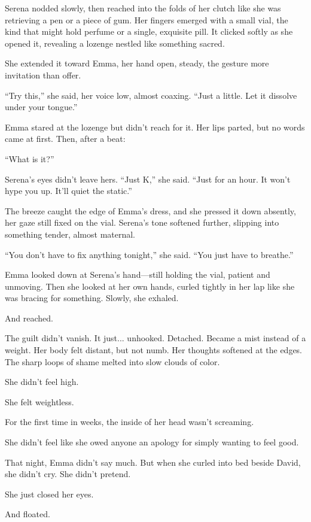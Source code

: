 Serena nodded slowly, then reached into the folds of her clutch like she was retrieving a pen 
or a piece of gum. Her fingers emerged with a small vial, the kind that might hold perfume or a single, 
exquisite pill. It clicked softly as she opened it, revealing a lozenge nestled like something sacred.

She extended it toward Emma, her hand open, steady, the gesture more invitation than offer.

“Try this,” she said, her voice low, almost coaxing. “Just a little. Let it dissolve under your tongue.”

Emma stared at the lozenge but didn’t reach for it. Her lips parted, but no words came at first. Then, 
after a beat:

“What is it?”

Serena’s eyes didn’t leave hers. “Just K,” she said. “Just for an hour. It won’t hype you up. It’ll 
quiet the static.”

The breeze caught the edge of Emma’s dress, and she pressed it down absently, her gaze still fixed 
on the vial. Serena’s tone softened further, slipping into something tender, almost maternal.

“You don’t have to fix anything tonight,” she said. “You just have to breathe.”

Emma looked down at Serena’s hand—still holding the vial, patient and unmoving. Then she looked at 
her own hands, curled tightly in her lap like she was bracing for something. Slowly, she exhaled.

And reached.

The guilt didn’t vanish. It just... unhooked. Detached. Became a mist instead of a weight. Her body 
felt distant, but not numb. Her thoughts softened at the edges. The sharp loops of shame melted into 
slow clouds of color.

She didn’t feel high.

She felt weightless.

For the first time in weeks, the inside of her head wasn’t screaming.

She didn’t feel like she owed anyone an apology for simply wanting to feel good.

That night, Emma didn’t say much. But when she curled into bed beside David, she didn’t cry.
She didn’t pretend.

She just closed her eyes.

And floated.

